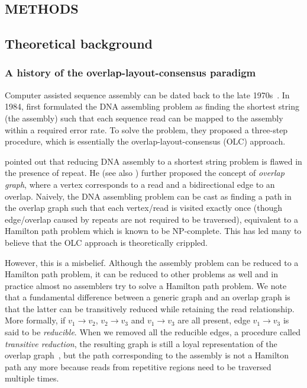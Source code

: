 \documentclass{bioinfo}
\begin{document}
\begin{methods}
\section{METHODS}
\subsection{Theoretical background}
\subsubsection{A history of the overlap-layout-consensus paradigm}
Computer assisted sequence assembly can be dated back to the late
1970s~\citep{Staden:1979dq,Gingeras:1979cr}. 
In 1984, \citeauthor{Peltola:1984qf} first formulated the DNA assembling
problem as finding the shortest string (the assembly) such that each sequence
read can be mapped to the assembly within a required error rate.
To solve the problem, they proposed a three-step procedure, which is
essentially the overlap-layout-consensus (OLC) approach.

\citet{Myers:1995nx} pointed out that reducing DNA assembly to a shortest
string problem is flawed in the presence of repeat. He (see also
\citealt{DBLP:journals/algorithmica/KececiogluM95}) further proposed the
concept of \emph{overlap graph}, where a vertex corresponds to a read and a
bidirectional edge to an overlap. Naively, the DNA assembling
problem can be cast as finding a path in the overlap graph such that
each vertex/read is visited exactly once (though edge/overlap caused by
repeats are not required to be traversed), equivalent to a Hamilton path
problem which is known to be NP-complete. This has led many to believe that the
OLC approach is theoretically crippled.

However, this is a misbelief. Although the assembly problem can be reduced
to a Hamilton path problem, it can be reduced to other problems as well and
in practice almost no assemblers try to solve a Hamilton path problem.
We note that a fundamental difference between a generic
graph and an overlap graph is that the latter can be transitively
reduced while retaining the read relationship. More formally,
if $v_1\to v_2$, $v_2\to v_3$ and $v_1\to v_3$ are all present,
edge $v_1\to v_3$ is said to be \emph{reducible}. When we removed all the
reducible edges, a procedure called \emph{transitive reduction}, the resulting graph
is still a loyal representation of the overlap graph~\citep{Myers:1995nx}, but
the path corresponding to the assembly is not a Hamilton path any more because
reads from repetitive regions need to be traversed multiple times.


\end{methods}
\end{document}
